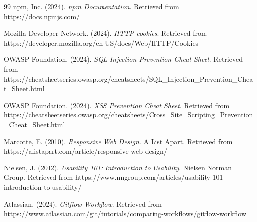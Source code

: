\begin{thebibliography}{99}
npm, Inc. (2024). \textit{npm Documentation}. Retrieved from https://docs.npmjs.com/

Mozilla Developer Network. (2024). \textit{HTTP cookies}. Retrieved from https://developer.mozilla.org/en-US/docs/Web/HTTP/Cookies

OWASP Foundation. (2024). \textit{SQL Injection Prevention Cheat Sheet}. Retrieved from https://cheatsheetseries.owasp.org/cheatsheets/SQL_Injection_Prevention_Cheat_Sheet.html

OWASP Foundation. (2024). \textit{XSS Prevention Cheat Sheet}. Retrieved from https://cheatsheetseries.owasp.org/cheatsheets/Cross_Site_Scripting_Prevention_Cheat_Sheet.html

Marcotte, E. (2010). \textit{Responsive Web Design}. A List Apart. Retrieved from https://alistapart.com/article/responsive-web-design/

Nielsen, J. (2012). \textit{Usability 101: Introduction to Usability}. Nielsen Norman Group. Retrieved from https://www.nngroup.com/articles/usability-101-introduction-to-usability/

Atlassian. (2024). \textit{Gitflow Workflow}. Retrieved from https://www.atlassian.com/git/tutorials/comparing-workflows/gitflow-workflow

\end{thebibliography}
